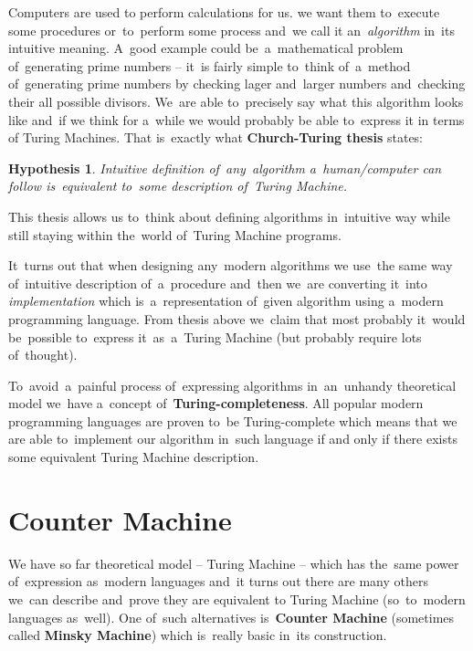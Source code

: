 \documentclass[english,shortabstract,mgr]{iithesis}
\newtheorem*{hypothesis}{Hypothesis}
\begin{document}
Computers are used to perform calculations for us. we want them to~execute some
procedures or~to~perform some process and~we call it an~\textit{algorithm} in~its intuitive meaning.
A~good example could be~a~mathematical problem of~generating prime numbers -- it~is fairly simple
to~think of~a~method of~generating prime numbers by checking lager and~larger numbers and~checking
their all possible divisors. We~are able to~precisely say what this algorithm looks like and~if
we think for a~while we would probably be able to~express it in terms of Turing Machines. That
is~exactly what \textbf{Church-Turing thesis} \cite{sipser2012ChurchTuring} states:

\begin{hypothesis}
  Intuitive definition of~any~algorithm a~human/computer can follow is~equivalent
  to~some description of~Turing Machine.
\end{hypothesis}

This thesis allows us to~think about defining algorithms in~intuitive way while still staying
within the~world of~Turing Machine programs.

It~turns out that when designing any~modern algorithms we use~the same way of~intuitive description
of~a~procedure and~then we~are converting it~into \textit{implementation} which is~a~representation
of~given algorithm using a~modern programming language. From thesis above we~claim that most probably
it~would be~possible to~express it~as~a~Turing Machine (but probably require lots of~thought).

To~avoid~a~painful process of~expressing algorithms in~an~unhandy theoretical model we~have
a~concept of~\textbf{Turing-completeness}. All popular modern programming languages are proven
to~be Turing-complete which means that we are able to~implement our algorithm in~such
language if and only if there exists some equivalent Turing Machine description.

\section{Counter Machine}

We have so far theoretical model -- Turing Machine -- which has the~same power of~expression
as~modern languages and~it turns out there are many others we~can describe and~prove they are
equivalent to Turing Machine (so~to~modern languages as~well). One of~such alternatives
is~\textbf{Counter Machine} (sometimes called \textbf{Minsky Machine}) \cite{minsky_67}
which is~really basic in~its construction.
\end{document}
